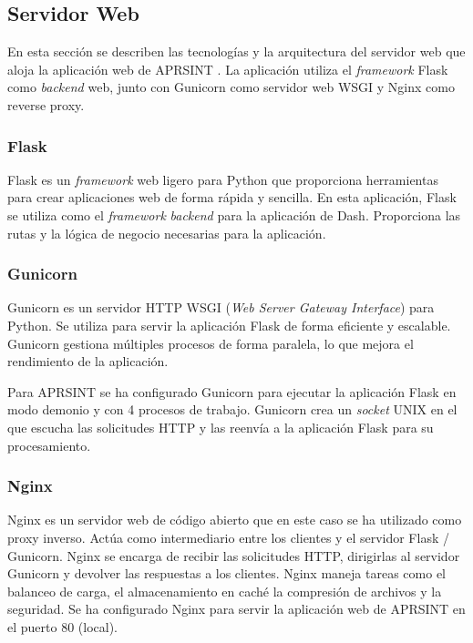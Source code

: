 \subsection{Servidor Web}

En esta sección se describen las tecnologías y la arquitectura del servidor web que aloja la aplicación web de APRSINT \cite{WebServer}. La aplicación utiliza el \textit{framework} Flask como \textit{backend} web, junto con Gunicorn como servidor web WSGI y Nginx como reverse proxy.

\subsubsection*{Flask}

Flask es un \textit{framework} web ligero para Python que proporciona herramientas para crear aplicaciones web de forma rápida y sencilla. En esta aplicación, Flask se utiliza como el \textit{framework} \textit{backend} para la aplicación de Dash. Proporciona las rutas y la lógica de negocio necesarias para la aplicación.

\subsubsection*{Gunicorn}

Gunicorn es un servidor HTTP WSGI (\textit{Web Server Gateway Interface}) para Python. Se utiliza para servir la aplicación Flask de forma eficiente y escalable. Gunicorn gestiona múltiples procesos de forma paralela, lo que mejora el rendimiento de la aplicación.

Para APRSINT se ha configurado Gunicorn para ejecutar la aplicación Flask en modo demonio y con 4 procesos de trabajo. Gunicorn crea un \textit{socket} UNIX en el que escucha las solicitudes HTTP y las reenvía a la aplicación Flask para su procesamiento.

\subsubsection*{Nginx}

Nginx es un servidor web de código abierto que en este caso se ha utilizado como proxy inverso. Actúa como intermediario entre los clientes y el servidor Flask / Gunicorn. Nginx se encarga de recibir las solicitudes HTTP, dirigirlas al servidor Gunicorn y devolver las respuestas a los clientes. Nginx maneja tareas como el balanceo de carga, el almacenamiento en caché la compresión de archivos y la seguridad. Se ha configurado Nginx para servir la aplicación web de APRSINT en el puerto 80 (local).

